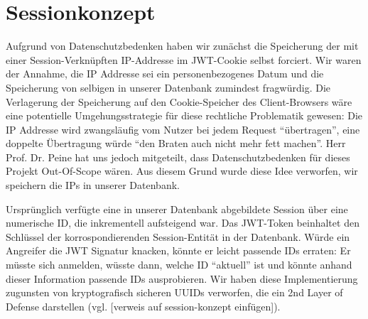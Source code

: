 \documentclass[12pt,DIV14,BCOR10mm,a4paper,twoside,parskip=half-,headsepline,headinclude,english,ngerman,bibliography=totocnumbered]{scrreprt}
\begin{document}
\section{Sessionkonzept}
Aufgrund von Datenschutzbedenken haben wir zunächst die Speicherung der mit einer Session-Verknüpften IP-Addresse im JWT-Cookie selbst forciert. Wir waren der Annahme, die IP Addresse sei ein personenbezogenes Datum und die Speicherung von selbigen in unserer Datenbank zumindest fragwürdig. Die Verlagerung der Speicherung auf den Cookie-Speicher des Client-Browsers wäre eine potentielle Umgehungsstrategie für diese rechtliche Problematik gewesen: Die IP Addresse wird zwangsläufig vom Nutzer bei jedem Request ``übertragen'', eine doppelte Übertragung würde ``den Braten auch nicht mehr fett machen''. Herr Prof. Dr. Peine hat uns jedoch mitgeteilt, dass Datenschutzbedenken für dieses Projekt Out-Of-Scope wären. Aus diesem Grund wurde diese Idee verworfen, wir speichern die IPs in unserer Datenbank.

Ursprünglich verfügte eine in unserer Datenbank abgebildete Session über eine numerische ID, die inkrementell aufsteigend war. Das JWT-Token beinhaltet den Schlüssel der korrospondierenden Session-Entität in der Datenbank. Würde ein Angreifer die JWT Signatur knacken, könnte er leicht passende IDs erraten: Er müsste sich anmelden, wüsste dann, welche ID ``aktuell'' ist und könnte anhand dieser Information passende IDs ausprobieren. Wir haben diese Implementierung zugunsten von kryptografisch sicheren UUIDs verworfen, die ein 2nd Layer of Defense darstellen (vgl. [verweis auf session-konzept einfügen]).

\printbibliography

\printacronyms[title=Abkürzungsverzeichnis,toctitle=Abkürzungsverzeichnis]
\printglossary[type=main]

\listoffigures      %

\end{document}
